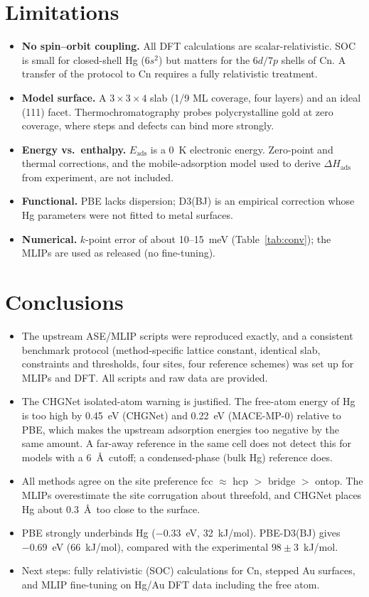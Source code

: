 \documentclass[11pt,a4paper]{article}
\newcommand{\Eads}{E_\mathrm{ads}}
\begin{document}
\section{Limitations}\label{sec:limits}
\begin{itemize}
\item \textbf{No spin--orbit coupling.} All DFT calculations are scalar-relativistic. SOC is small for closed-shell Hg ($6s^2$) but matters for the $6d/7p$ shells of Cn. A transfer of the protocol to Cn requires a fully relativistic treatment.
\item \textbf{Model surface.} A $3\times3\times4$ slab (1/9 ML coverage, four layers) and an ideal (111) facet. Thermochromatography probes polycrystalline gold at zero coverage, where steps and defects can bind more strongly.
\item \textbf{Energy vs.\ enthalpy.} $\Eads$ is a 0~K electronic energy. Zero-point and thermal corrections, and the mobile-adsorption model used to derive $\Delta H_\mathrm{ads}$ from experiment, are not included.
\item \textbf{Functional.} PBE lacks dispersion; D3(BJ) is an empirical correction whose Hg parameters were not fitted to metal surfaces.
\item \textbf{Numerical.} $k$-point error of about 10--15~meV (Table~\ref{tab:conv}); the MLIPs are used as released (no fine-tuning).
\end{itemize}

\section{Conclusions}
\begin{itemize}
\item The upstream ASE/MLIP scripts were reproduced exactly, and a consistent benchmark protocol (method-specific lattice constant, identical slab, constraints and thresholds, four sites, four reference schemes) was set up for MLIPs and DFT. All scripts and raw data are provided.
\item The CHGNet isolated-atom warning is justified. The free-atom energy of Hg is too high by 0.45~eV (CHGNet) and 0.22~eV (MACE-MP-0) relative to PBE, which makes the upstream adsorption energies too negative by the same amount. A far-away reference in the same cell does not detect this for models with a 6~\AA\ cutoff; a condensed-phase (bulk Hg) reference does.
\item All methods agree on the site preference fcc $\approx$ hcp $>$ bridge $>$ ontop. The MLIPs overestimate the site corrugation about threefold, and CHGNet places Hg about 0.3~\AA\ too close to the surface.
\item PBE strongly underbinds Hg ($-0.33$~eV, 32~kJ/mol). PBE-D3(BJ) gives $-0.69$~eV (66~kJ/mol), compared with the experimental $98\pm3$~kJ/mol.
\item Next steps: fully relativistic (SOC) calculations for Cn, stepped Au surfaces, and MLIP fine-tuning on Hg/Au DFT data including the free atom.
\end{itemize}
\end{document}
